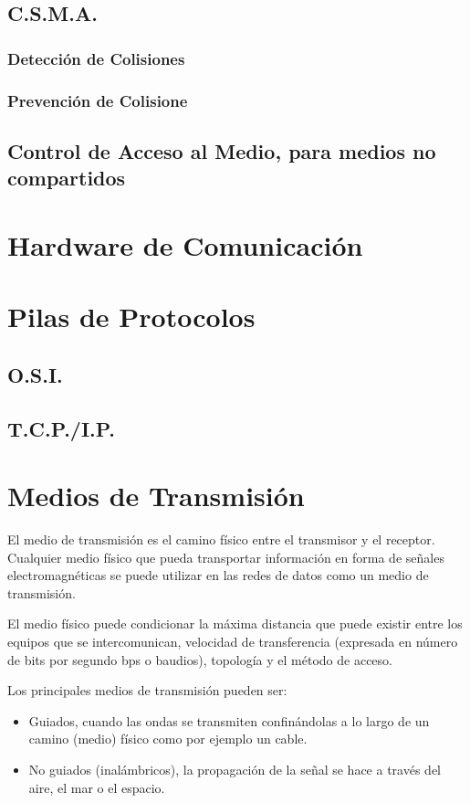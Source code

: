 \documentclass[a4paper]{article}
\begin{document}
	\subsection{C.S.M.A.}
		\subsubsection{Detección de Colisiones}
		\subsubsection{Prevención de Colisione}
	\subsection{Control de Acceso al Medio, para medios no compartidos}

\section{Hardware de Comunicación}

\section{Pilas de Protocolos}
	\subsection{O.S.I.}
	\subsection{T.C.P./I.P.}

\section{Medios de Transmisi\'on}
\label{sec:theory}

El medio de transmisión es el camino físico entre el transmisor y el
receptor. Cualquier medio físico que pueda transportar información en
forma de señales electromagnéticas se puede utilizar en las redes de
datos como un medio de transmisión.

El medio físico puede condicionar la máxima distancia que puede existir
entre los equipos que se intercomunican, velocidad de transferencia
(expresada en número de bits por segundo bps o baudios), topología y el
método de acceso.

Los principales medios de transmisión pueden ser:

\begin{itemize}
  \item Guiados, cuando las ondas se transmiten confinándolas a lo largo de un
  camino (medio) físico como por ejemplo un cable.
  
  \item No guiados (inalámbricos), la propagación de la señal se hace a través
  del aire, el mar o el espacio.  
\end{itemize}
\end{document}
